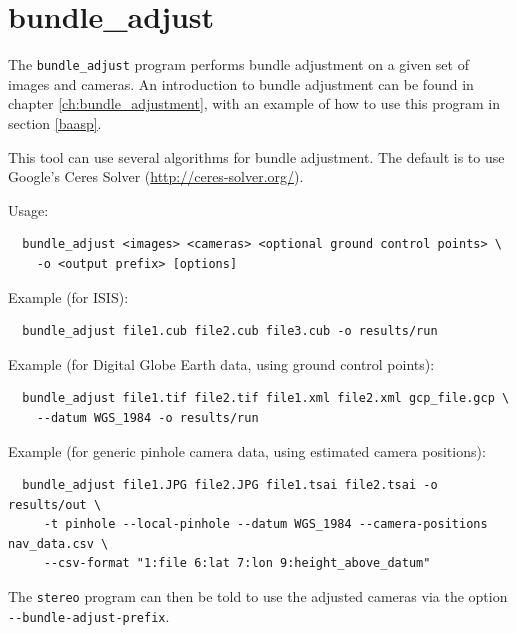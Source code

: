 \newpage
\section{bundle\_adjust}
\label{bundleadjust}

The \texttt{bundle\_adjust} program performs bundle adjustment on a
given set of images and cameras. An introduction to bundle adjustment
can be found in chapter \ref{ch:bundle_adjustment}, with an example of
how to use this program in section \ref{baasp}.

This tool can use several algorithms for bundle adjustment. The default is
to use Google's Ceres Solver (\url{http://ceres-solver.org/}).

Usage:
\begin{verbatim}
  bundle_adjust <images> <cameras> <optional ground control points> \
    -o <output prefix> [options]
\end{verbatim}

Example (for ISIS):
\begin{verbatim}
  bundle_adjust file1.cub file2.cub file3.cub -o results/run
\end{verbatim}

Example (for Digital Globe Earth data, using ground control points):
\begin{verbatim}
  bundle_adjust file1.tif file2.tif file1.xml file2.xml gcp_file.gcp \
    --datum WGS_1984 -o results/run
\end{verbatim}

Example (for generic pinhole camera data, using estimated camera positions):
\begin{verbatim}
  bundle_adjust file1.JPG file2.JPG file1.tsai file2.tsai -o results/out \
     -t pinhole --local-pinhole --datum WGS_1984 --camera-positions nav_data.csv \
     --csv-format "1:file 6:lat 7:lon 9:height_above_datum"
\end{verbatim}

The \texttt{stereo} program can then be told to use the adjusted cameras
via the option \texttt{-\/-bundle-adjust-prefix}.


